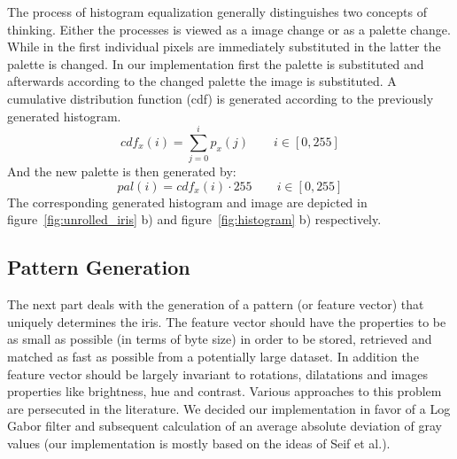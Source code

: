 \documentclass[journal]{IEEEtran}
\begin{document}
The process of histogram equalization generally distinguishes two concepts of thinking. Either the processes is viewed as a image change or as a palette change. While in the first individual pixels are immediately substituted in the latter the palette is changed. In our implementation first the palette is substituted and afterwards according to the changed palette the image is substituted.
A cumulative distribution function (cdf) is generated according to the previously generated histogram.
\[
	cdf_x(i) = \sum \limits_{j=0}^{i} p_x(j) \qquad i \in [0, 255]
\]
And the new palette is then generated by:
\[
	pal(i) = cdf_x(i) \cdot 255  \qquad i \in [0, 255]
\]
The corresponding generated histogram and image are depicted in figure~\ref{fig:unrolled_iris} b) and figure~\ref{fig:histogram} b) respectively.
\subsection{Pattern Generation}
The next part deals with the generation of a pattern (or feature vector) that uniquely determines the iris. The feature vector should have the properties to be as small as possible (in terms of byte size) in order to be stored, retrieved and matched as fast as possible from a potentially large dataset. In addition the feature vector should be largely invariant to rotations, dilatations and images properties like brightness, hue and contrast. Various approaches to this problem are persecuted in the literature. We decided our implementation in favor of a Log Gabor filter and subsequent calculation of an average absolute deviation of gray values (our implementation is mostly based on the ideas of Seif et al.\cite{seif2003iris}). 
\end{document}
